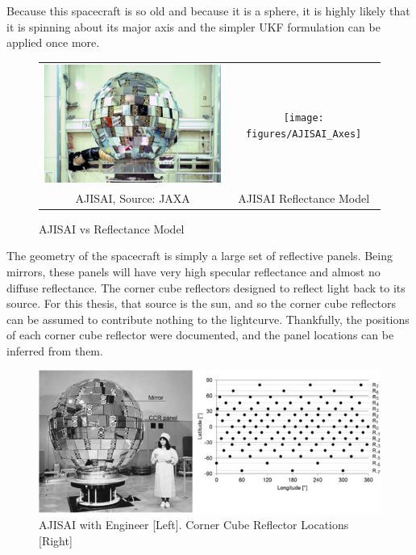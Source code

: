 Because this spacecraft is so old and because it is a sphere, it is highly likely that it is spinning about its major axis and the simpler UKF formulation can be applied once more.

\begin{figure}[!ht]
	\begin{tabular}{cc}
	\includegraphics[width = 90mm]{figures/ajisai.jpg} & \texttt{[image: figures/AJISAI\_Axes]} \\
	AJISAI, Source: JAXA & AJISAI Reflectance Model
	\end{tabular}
	\caption{AJISAI vs Reflectance Model}
\end{figure}



The geometry of the spacecraft is simply a large set of reflective panels. Being mirrors, these panels will have very high specular reflectance and almost no diffuse reflectance. The corner cube reflectors designed to reflect light back to its source. For this thesis, that source is the sun, and so the corner cube reflectors can be assumed to contribute nothing to the lightcurve. Thankfully, the positions of each corner cube reflector were documented, and the panel locations can be inferred from them.

\begin{figure}
	\centering
	\includegraphics[width = 150mm]{figures/ajisai_panels.jpg}
	\caption{AJISAI with Engineer [Left]. Corner Cube Reflector Locations [Right] \cite{ajisai}}
\end{figure}



